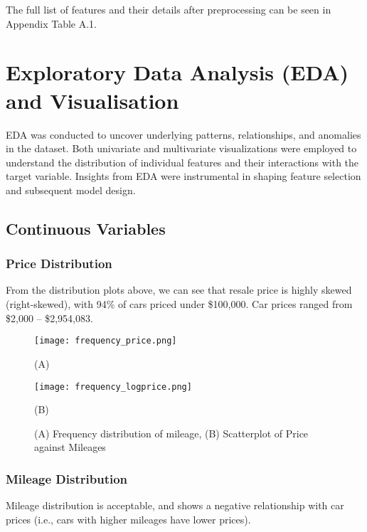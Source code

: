 \documentclass{article}
\begin{document}
The full list of features and their details after preprocessing can be seen in Appendix Table A.1. 
\newpage
\section{Exploratory Data Analysis (EDA) and Visualisation}

EDA was conducted to uncover underlying patterns, relationships, and anomalies in the dataset. Both univariate and multivariate visualizations were employed to understand the distribution of individual features and their interactions with the target variable. Insights from EDA were instrumental in shaping feature selection and subsequent model design.

\subsection{Continuous Variables}
\subsubsection{Price Distribution}

From the distribution plots above, we can see that resale price is highly skewed (right-skewed), with 94\% of cars priced under \$100,000. Car prices ranged from \$2,000 -- \$2,954,083.

\begin{figure}[H]
    \centering
    \begin{minipage}[b]{0.45\textwidth}
        \centering
        \texttt{[image: frequency\_price.png]}
        \centerline{(A)}
    \end{minipage}
    \hfill
    \begin{minipage}[b]{0.45\textwidth}
        \centering
        \texttt{[image: frequency\_logprice.png]}
        \centerline{(B)}
    \end{minipage}
    \caption{(A) Frequency distribution of mileage, (B) Scatterplot of Price against Mileages}
    \label{fig:mileage_dist}
\end{figure}

\subsubsection{Mileage Distribution}

Mileage distribution is acceptable, and shows a negative relationship with car prices (i.e., cars with higher mileages have lower prices).
\end{document}
